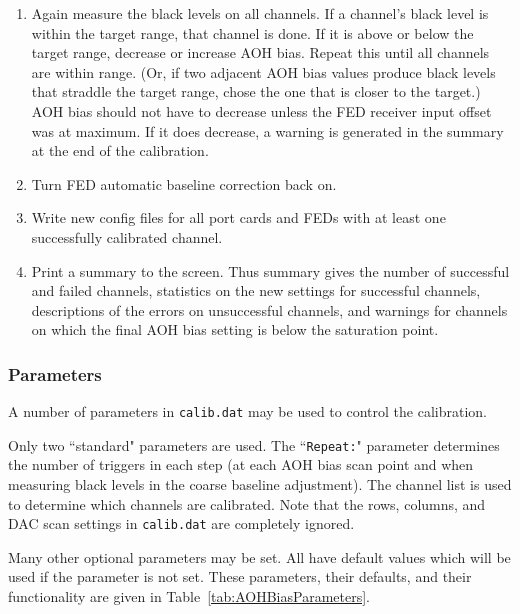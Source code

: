 \begin{enumerate}
\item Again measure the black levels on all channels.  If a channel's black level is within the target range, that channel is done.  If it is above or below the target range, decrease or increase AOH bias.  Repeat this until all channels are within range.  (Or, if two adjacent AOH bias values produce black levels that straddle the target range, chose the one that is closer to the target.)  AOH bias should not have to decrease unless the FED receiver input offset was at maximum.  If it does decrease, a warning is generated in
the summary at the end of the calibration. 
\item Turn FED automatic baseline correction back on.
\item Write new config files for all port cards and FEDs with at least one successfully calibrated channel.
\item Print a summary to the screen.  Thus summary gives the number of successful and failed channels, statistics on the new settings for successful channels, descriptions of the errors on unsuccessful channels, and warnings for channels on which the final AOH bias setting is below the saturation point.
\end{enumerate}

\subsubsection{Parameters}
A number of parameters in \verb|calib.dat| may be used to control the calibration.

Only two ``standard" parameters are used.  The ``\verb|Repeat:|" parameter determines the number of triggers in each step (at each AOH bias scan point and when measuring black levels in the coarse baseline adjustment).  The channel list is used to determine which channels are calibrated.  Note that the rows, columns, and DAC scan settings in \verb|calib.dat| are completely ignored.

Many other optional parameters may be set.  All have default values which will be used if the parameter is not set.  These parameters, their defaults, and their functionality are given in Table~\ref{tab:AOHBiasParameters}.


